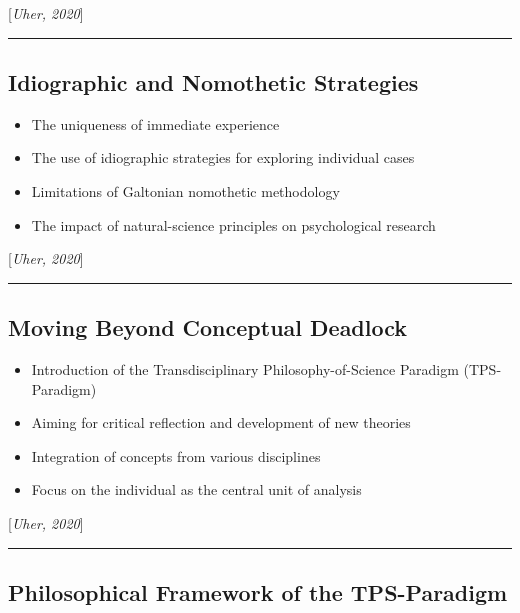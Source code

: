 \documentclass[
  letterpaper,
  DIV=11,
  numbers=noendperiod]{scrartcl}
\providecommand{\tightlist}{%
  \setlength{\itemsep}{0pt}\setlength{\parskip}{0pt}}\usepackage{longtable,booktabs,array}
\begin{document}
{[}\emph{Uher, 2020}{]}

\begin{center}\rule{0.5\linewidth}{0.5pt}\end{center}

\subsection{Idiographic and Nomothetic
Strategies}\label{idiographic-and-nomothetic-strategies}

\begin{itemize}
\tightlist
\item
  The uniqueness of immediate experience
\item
  The use of idiographic strategies for exploring individual cases
\item
  Limitations of Galtonian nomothetic methodology
\item
  The impact of natural-science principles on psychological research
\end{itemize}

{[}\emph{Uher, 2020}{]}

\begin{center}\rule{0.5\linewidth}{0.5pt}\end{center}

\subsection{Moving Beyond Conceptual
Deadlock}\label{moving-beyond-conceptual-deadlock}

\begin{itemize}
\tightlist
\item
  Introduction of the Transdisciplinary Philosophy-of-Science Paradigm
  (TPS-Paradigm)
\item
  Aiming for critical reflection and development of new theories
\item
  Integration of concepts from various disciplines
\item
  Focus on the individual as the central unit of analysis
\end{itemize}

{[}\emph{Uher, 2020}{]}

\begin{center}\rule{0.5\linewidth}{0.5pt}\end{center}

\subsection{Philosophical Framework of the
TPS-Paradigm}\label{philosophical-framework-of-the-tps-paradigm}
\end{document}
